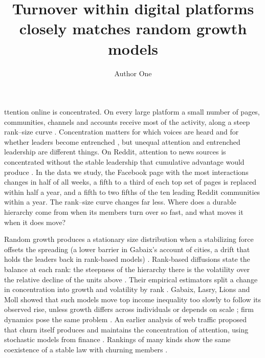 \documentclass[9pt,twocolumn,twoside]{pnas-new}
\title{Turnover within digital platforms closely matches random growth models}
\author[a,1]{Author One}
\affil[a]{Affiliation placeholder}
\newif\iffinal \finalfalse
\begin{document}
\maketitle
\thispagestyle{firststyle}
\Firstpage

ttention online is concentrated. On every large platform a small number of pages, communities, channels and accounts receive most of the activity, along a steep rank--size curve \cite{hindman2009,webster2012}. Concentration matters for which voices are heard and for whether leaders become entrenched \cite{webster2012,yang2020}, but unequal attention and entrenched leadership are different things. On Reddit, attention to news sources is concentrated without the stable leadership that cumulative advantage would produce \cite{hagar2022}. In the data we study, the Facebook page with the most interactions changes in half of all weeks, a fifth to a third of each top set of pages is replaced within half a year, and a fifth to two fifths of the ten leading Reddit communities within a year. The rank--size curve changes far less. Where does a durable hierarchy come from when its members turn over so fast, and what moves it when it does move?

Random growth produces a stationary size distribution when a stabilizing force offsets the spreading (a lower barrier in Gabaix's account of cities, a drift that holds the leaders back in rank-based models) \cite{gibrat1931,gabaix1999,gabaix2009}. Rank-based diffusions state the balance at each rank: the steepness of the hierarchy there is the volatility over the relative decline of the units above \cite{fernholz2002,banner2005,fernholzfernholz2020}. Their empirical estimators split a change in concentration into growth and volatility by rank \cite{fernholz2017,fernholzkoch2021}. Gabaix, Lasry, Lions and Moll showed that such models move top income inequality too slowly to follow its observed rise, unless growth differs across individuals or depends on scale \cite{gllm2016}; firm dynamics pose the same problem \cite{luttmer2011}. An earlier analysis of web traffic proposed that churn itself produces and maintains the concentration of attention, using stochastic models from finance \cite{hindman2018}. \iffinal This paper continues that analysis with rank-by-rank measurement, a tested accounting and simulated comparisons, and corrects its reading of size dependence (\textit{Discussion}). \fi Rankings of many kinds show the same coexistence of a stable law with churning members \cite{iniguez2022}.
\end{document}
